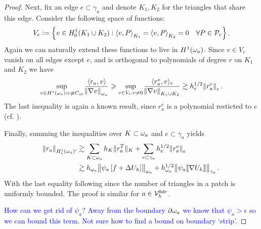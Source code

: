 \documentclass[thesis.tex]{subfiles}
\begin{document}
\begin{proof}
  Next, fix an edge $e \subset \gamma_a$ and denote $K_1, K_2$ for the triangles that share this edge. Consider the following space of functions:
  \[
  V_e := \set{v \in H_0^1(K_1 \cup K_2) : \left \langle v,P \right \rangle_{K_1}= \left \langle v,P \right \rangle_{K_2} = 0\quad \forall P \in \mathcal{P}_r}.\]
  Again we can naturally extend these functions to live in $H^1(\omega_a)$. Since $v \in V_e$ vanish on all edges except $e$, and
  is orthogonal to polynomials of degree $r$ on $K_1$ and $K_2$ we have
  \[
         \sup_{v \in H^1(\omega_a) : v \not \equiv C_{st}} { \left \langle r_a, v \right \rangle \over \norm{\nabla v}_{\omega_a}} 
         \geqslant \sup_{v \in V_e: v \ne 0} { \langle r^e_a, v \rangle_e \over \norm{\nabla v}_{K_1 \cup K_2}}
         \gtrsim h_e^{1/2} \norm{r^e_a}_e.
  \]
  The last inequality is again a known result, since $r^e_a$ is a polynomial resticted to $e$ (cf. \cite[Ex~9.x.7]{brenner}).

  Finally, summing the inequalities over $K \subset \omega_a$ and $e \subset \gamma_a$ yields
  \begin{align*}
    \norm{r_a}_{H_\star^1(\omega_a)'} &\gtrsim \sum_{K \subset \omega_a} h_K \|{r^T_a}\|_K + \sum_{e \subset \gamma_a} h_e^{1/2} \norm{r^e_a}_e\\
    &\gtrsim h_{\omega_a} \norm{\psi_a \left[ f + \Delta U_h \right]}_{\omega_a} + h_{\omega_a}^{1/2} \norm{ \psi_a \llbracket \nabla U_h \rrbracket}_{\gamma_a}.
  \end{align*}
  With the last equality following since the number of triangles in a patch is uniformly bounded. The proof is similar for $a \in \mathcal{V}_h^{bdr}$.

  \textcolor{blue}{How can we get rid of $\psi_a$? Away from the boundary $\partial \omega_a$ we know that $\psi_a > \epsilon$ so we can bound this term. Not sure how to find a bound on boundary `strip'.}



\end{proof}
\end{document}
